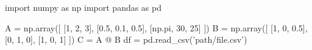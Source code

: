\begin{python}[
    title={Python example}, 
    caption={Python example}, 
    label={lst: pe}]
import numpy as np
import pandas as pd

A = np.array([
    [1, 2, 3],
    [0.5, 0.1, 0.5], 
    [np.pi, 30, 25]
])
B = np.array([
    [1, 0, 0.5],
    [0, 1, 0], 
    [1, 0, 1]
])
C = A @ B
df = pd.read_csv('path/file.csv')
\end{python}